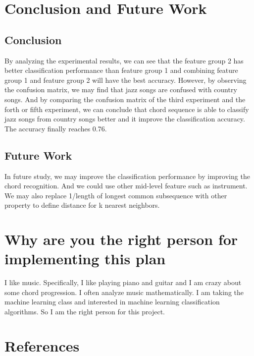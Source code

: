 \documentclass{article} %
\begin{document}
\section{Conclusion and Future Work}
\subsection{Conclusion}
By analyzing the experimental results, we can see that the feature group 2 has better classification performance than feature group 1 and combining feature group 1 and feature group 2 will have the best accuracy. However, by observing the confusion matrix, we may find that jazz songs are confused with country songs. And by comparing the confusion matrix of the third experiment and the forth or fifth experiment, we can conclude that chord sequence is able to classify jazz songs from country songs better and it improve the classification accuracy. The accuracy finally reaches 0.76.
\subsection{Future Work}
In future study, we may improve the classification performance by improving the chord recognition. And we could use other mid-level feature such as instrument. We may also replace 1/length of longest common subsequence with other property to define distance for k nearest neighbors.

\section{Why are you the right person for implementing this plan}
I like music. Specifically, I like playing piano and guitar and I am crazy about some chord progression. I often analyze music mathematically. I am taking the machine learning class and interested in machine learning classification algorithms. So I am the right person for this project.


\section*{References}
\end{document}
